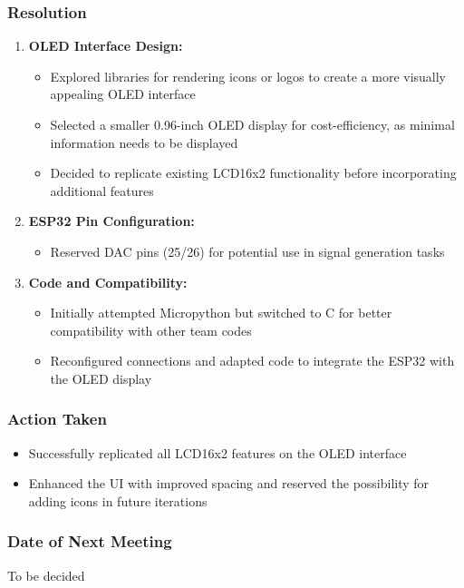 \documentclass[12pt,a4paper]{article}
\begin{document}
\subsubsection*{Resolution}
\begin{enumerate}
    \item \textbf{OLED Interface Design:}
    \begin{itemize}
         \item Explored libraries for rendering icons or logos to create a more visually appealing OLED interface
        \item Selected a smaller 0.96-inch OLED display for cost-efficiency, as minimal information needs to be displayed
        \item Decided to replicate existing LCD16x2 functionality before incorporating additional features
    \end{itemize}
    \item \textbf{ESP32 Pin Configuration: }
    \begin{itemize}
        \item Reserved DAC pins (25/26) for potential use in signal generation tasks
    \end{itemize}
    \item \textbf{Code and Compatibility:}
    \begin{itemize}
        \item Initially attempted Micropython but switched to C for better compatibility with other team codes
        \item Reconfigured connections and adapted code to integrate the ESP32 with the OLED display
    \end{itemize}
\end{enumerate}
\subsubsection*{Action Taken}
\begin{itemize}
      \item Successfully replicated all LCD16x2 features on the OLED interface
    \item Enhanced the UI with improved spacing and reserved the possibility for adding icons in future iterations
\end{itemize}
\subsubsection*{Date of Next Meeting}
To be decided
\end{document}
